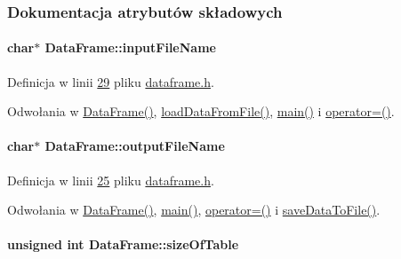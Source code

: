 \subsubsection{Dokumentacja atrybutów składowych}
\hypertarget{class_data_frame_a90041bfdf474b0d7ce39bc3dbbb55aa9}{
\paragraph[{input\-File\-Name}]{\setlength{\rightskip}{0pt plus 5cm}char$\ast$ Data\-Frame\-::input\-File\-Name}}\label{class_data_frame_a90041bfdf474b0d7ce39bc3dbbb55aa9}


Definicja w linii \hyperlink{dataframe_8h_source_l00029}{29} pliku \hyperlink{dataframe_8h_source}{dataframe.\-h}.



Odwołania w \hyperlink{dataframe_8cpp_source_l00012}{Data\-Frame()}, \hyperlink{dataframe_8cpp_source_l00020}{load\-Data\-From\-File()}, \hyperlink{main_8cpp_source_l00019}{main()} i \hyperlink{dataframe_8cpp_source_l00044}{operator=()}.

\hypertarget{class_data_frame_a824a73f019aec71281837abafd95a510}{
\paragraph[{output\-File\-Name}]{\setlength{\rightskip}{0pt plus 5cm}char$\ast$ Data\-Frame\-::output\-File\-Name}}\label{class_data_frame_a824a73f019aec71281837abafd95a510}


Definicja w linii \hyperlink{dataframe_8h_source_l00025}{25} pliku \hyperlink{dataframe_8h_source}{dataframe.\-h}.



Odwołania w \hyperlink{dataframe_8cpp_source_l00012}{Data\-Frame()}, \hyperlink{main_8cpp_source_l00019}{main()}, \hyperlink{dataframe_8cpp_source_l00044}{operator=()} i \hyperlink{dataframe_8cpp_source_l00032}{save\-Data\-To\-File()}.

\hypertarget{class_data_frame_aa5d1905c6910cad07ab5189bd34b13ab}{
\paragraph[{size\-Of\-Table}]{\setlength{\rightskip}{0pt plus 5cm}unsigned int Data\-Frame\-::size\-Of\-Table}}\label{class_data_frame_aa5d1905c6910cad07ab5189bd34b13ab}


